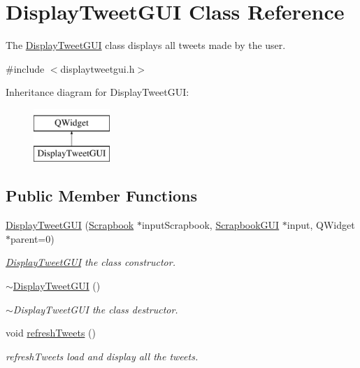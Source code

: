 \hypertarget{classDisplayTweetGUI}{}\section{Display\+Tweet\+G\+UI Class Reference}
\label{classDisplayTweetGUI}


The \hyperlink{classDisplayTweetGUI}{Display\+Tweet\+G\+UI} class displays all tweets made by the user.  




{\ttfamily \#include $<$displaytweetgui.\+h$>$}

Inheritance diagram for Display\+Tweet\+G\+UI\+:\begin{figure}[H]
\begin{center}
\leavevmode
\includegraphics[height=2.000000cm]{classDisplayTweetGUI}
\end{center}
\end{figure}
\subsection*{Public Member Functions}
\begin{DoxyCompactItemize}
\item 
\hyperlink{classDisplayTweetGUI_acf69466f7da4c1da346b436bc3654a98}{Display\+Tweet\+G\+UI} (\hyperlink{classScrapbook}{Scrapbook} $\ast$input\+Scrapbook, \hyperlink{classScrapbookGUI}{Scrapbook\+G\+UI} $\ast$input, Q\+Widget $\ast$parent=0)
\begin{DoxyCompactList}\small\item\em \hyperlink{classDisplayTweetGUI}{Display\+Tweet\+G\+UI} the class constructor. \end{DoxyCompactList}\item 
\hyperlink{classDisplayTweetGUI_a058a707e28db5414a1c83f3a3be84821}{$\sim$\+Display\+Tweet\+G\+UI} ()
\begin{DoxyCompactList}\small\item\em $\sim$\+Display\+Tweet\+G\+UI the class destructor. \end{DoxyCompactList}\item 
void \hyperlink{classDisplayTweetGUI_a745726bd70ebcdbde41e6fbc1bd65ef7}{refresh\+Tweets} ()\hypertarget{classDisplayTweetGUI_a745726bd70ebcdbde41e6fbc1bd65ef7}{}\label{classDisplayTweetGUI_a745726bd70ebcdbde41e6fbc1bd65ef7}

\begin{DoxyCompactList}\small\item\em refresh\+Tweets load and display all the tweets. \end{DoxyCompactList}\end{DoxyCompactItemize}


